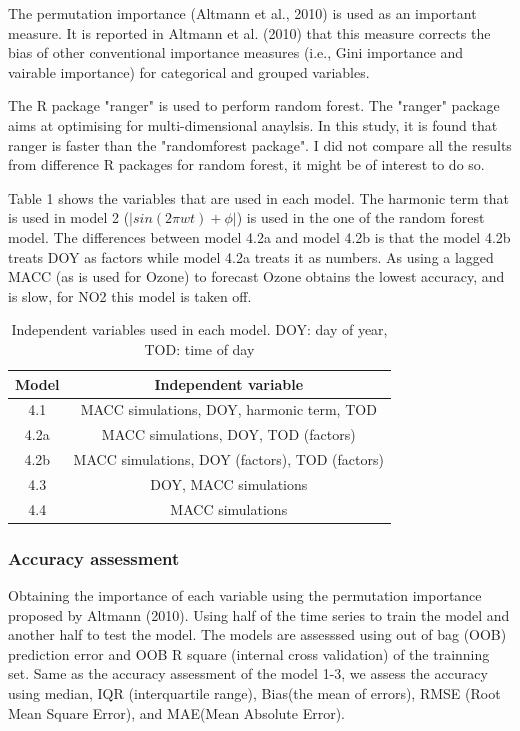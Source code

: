 \documentclass{article}
\begin{document}
The permutation importance (Altmann et al., 2010) is used as an important measure. It is reported in Altmann et al. (2010) that this measure corrects the bias of other conventional importance measures (i.e., Gini importance and vairable importance) for categorical and grouped variables.  

The R package "ranger" is used to perform random forest. The "ranger" package aims at optimising for multi-dimensional anaylsis. In this study, it is found that ranger is faster than the "randomforest package". I did not compare all the results from difference R packages for random forest, it might be of interest to do so. 
 
 Table 1 shows the variables that are used in each model. The harmonic term that is used in model 2  ($|sin(2 \pi wt) + \phi|$) is used in the one of the random forest model. The differences between model 4.2a and model 4.2b is that the model 4.2b treats DOY as factors while model 4.2a treats it as numbers. As using a lagged MACC (as is used for Ozone) to forecast Ozone obtains the lowest accuracy, and is slow, for NO2 this model is taken off.  



\begin{table}[h!]
\centering
\begin{tabular}{ c c  }
Model &  Independent variable\\ \hline 

 4.1 & MACC simulations, DOY, harmonic term, TOD \\
 4.2a & MACC simulations, DOY, TOD (factors) \\
 4.2b & MACC simulations, DOY (factors), TOD (factors) \\ 
 4.3 & DOY, MACC simulations \\
 4.4 & MACC simulations  \\  \hline
\end{tabular}
\caption{Independent variables used in each model. DOY: day of year, TOD: time of day  } 
\label{table:rf}
\end{table}

\subsubsection{ Accuracy assessment}

Obtaining the importance of each variable using the permutation importance proposed by Altmann (2010). Using half of the time series to train the model and another half to test the model. The models are assesssed using out of bag (OOB) prediction error and OOB R square (internal cross validation) of the trainning set. Same as the accuracy assessment of the model 1-3, we assess the accuracy using median, IQR (interquartile range), Bias(the mean of errors), RMSE (Root Mean Square Error), and MAE(Mean Absolute Error). 
\end{document}
